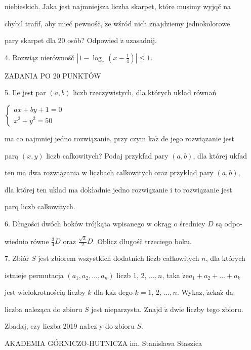 \documentclass[a4paper,12pt]{article}
\begin{document}
niebieskich. Jaka jest najmniejsza liczba skarpet, które musimy wyjqč na

chybil trafif, aby mieč pewnośč, $\dot{\mathrm{z}}\mathrm{e}$ wśród nich znajdziemy jednokolorowe

pary skarpet dla 20 osób? Odpowied $\acute{\mathrm{z}}$ uzasadnij.

4. Rozwiąz nierównośč $|1-\displaystyle \log_{x}(x-\frac{1}{4})|\leq 1.$

ZADANIA PO 20 PUNKTÓW

5. Ile jest par $(a,b)$ liczb rzeczywistych, dla których układ równań

$\left\{\begin{array}{l}
ax+by+1=0\\
x^{2}+y^{2}=50
\end{array}\right.$

ma co najmniej jedno rozwiązanie, przy czym $\mathrm{k}\mathrm{a}\dot{\mathrm{z}}$ de jego rozwiązanie jest

parą $(x,y)$ liczb cafkowitych? Podaj przykfad pary $(a,b)$, dla której ukfad

ten ma dwa rozwiązania w liczbach calkowitych oraz przykład pary $(a,b),$

dla której ten uklad ma dokładnie jedno rozwiązanie i to rozwiązanie jest

parq liczb calkowitych.

6. Długości dwóch boków trójkąta wpisanego w okrąg o średnicy $D$ są odpo-

wiednio równe $\displaystyle \frac{3}{4}D$ oraz $\displaystyle \frac{\sqrt{3}}{2}D$. Oblicz długośč trzeciego boku.

7. Zbiór $S$ jest zbiorem wszystkich dodatnich liczb całkowitych $n$, dla których

istnieje permutacja $(a_{1},a_{2},\ldots,a_{n})$ liczb 1, 2, $\ldots, n$, taka $\dot{\mathrm{z}}\mathrm{e}a_{1}+a_{2}+\ldots+a_{k}$

jest wielokrotnością liczby $k$ dla $\mathrm{k}\mathrm{a}\dot{\mathrm{z}}$ dego $k=1$, 2, $\ldots, n$. Wykaz, $\dot{\mathrm{z}}\mathrm{e}\mathrm{k}\mathrm{a}\dot{\mathrm{z}}$ da

liczba naleząca do zbioru $S$ jest nieparzysta. Znajd $\acute{\mathrm{z}}$ dwie liczby tego zbioru.

Zbadaj, czy liczba 2019 na1ez $\mathrm{y}$ do zbioru $S.$






AKADEMIA GÓRNICZO-HUTNICZA im. Stanislawa Staszica
\end{document}
